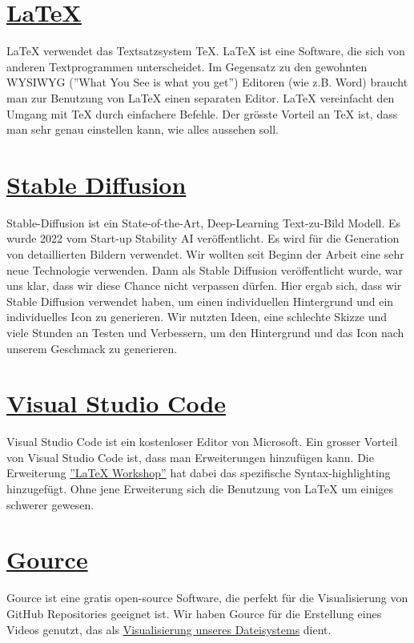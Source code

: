 \section{\href{https://www.latex-project.org/}{LaTeX}}
LaTeX verwendet das Textsatzsystem TeX. LaTeX ist eine Software, die sich von anderen Textprogrammen unterscheidet. Im Gegensatz zu den gewohnten WYSIWYG (''What You See is what you get'') Editoren (wie z.B. Word)
braucht man zur Benutzung von LaTeX einen separaten Editor. LaTeX vereinfacht den Umgang mit TeX durch einfachere Befehle. Der grösste Vorteil an TeX ist, dass man sehr genau einstellen kann, wie alles aussehen soll.


\section{\href{https://stability.ai/}{Stable Diffusion}}
Stable-Diffusion ist ein State-of-the-Art, Deep-Learning Text-zu-Bild Modell. Es wurde 2022 vom Start-up Stability AI veröffentlicht. Es wird für die Generation von detaillierten Bildern verwendet. Wir wollten seit
Beginn der Arbeit eine sehr neue Technologie verwenden. Dann als Stable Diffusion veröffentlicht wurde, war uns klar, dass wir diese Chance nicht verpassen dürfen. Hier ergab sich, dass wir Stable Diffusion verwendet haben, um einen individuellen
Hintergrund und ein individuelles Icon zu generieren. Wir nutzten Ideen, eine schlechte Skizze und viele Stunden an Testen und Verbessern, um den Hintergrund und das Icon nach unserem Geschmack zu generieren.

\section{\href{https://code.visualstudio.com/}{Visual Studio Code}}
Visual Studio Code ist ein kostenloser Editor von Microsoft. Ein grosser Vorteil von Visual Studio Code ist, dass man Erweiterungen hinzufügen kann. Die Erweiterung \href{https://marketplace.visualstudio.com/items?itemName=James-Yu.latex-workshop}{''LaTeX Workshop''}
hat dabei das spezifische Syntax-highlighting hinzugefügt. Ohne jene Erweiterung sich die Benutzung von LaTeX um einiges schwerer gewesen.

\section{\href{https://gource.io/}{Gource}}
Gource ist eine gratis open-source Software, die perfekt für die Visualisierung von GitHub Repositories geeignet ist. Wir haben Gource für die Erstellung eines Videos genutzt, das als \href{https://www.youtube.com/watch?v=IQT37uwpcg4}{Visualisierung unseres Dateisystems}
dient.

